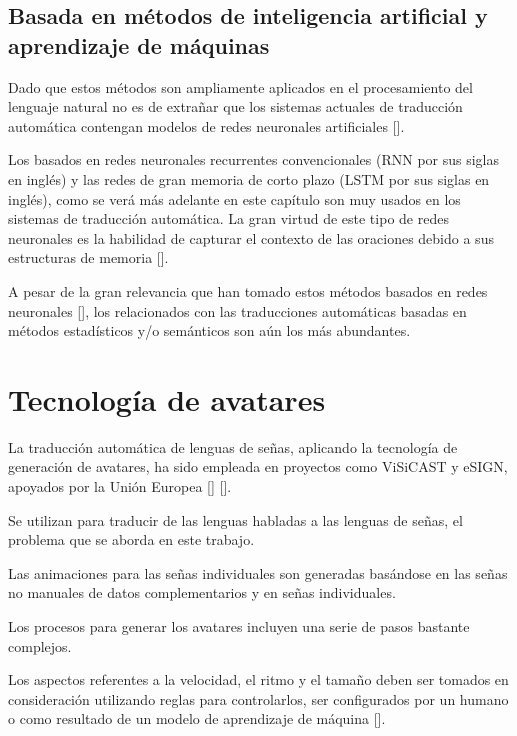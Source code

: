 \subsection{Basada en métodos de inteligencia artificial y aprendizaje de máquinas}\label{subsection:state-of-the-art:traduccion:maquina}
Dado que estos métodos son ampliamente aplicados en el procesamiento del lenguaje natural no es de extrañar que los sistemas actuales de traducción automática contengan modelos de redes
neuronales artificiales [\cite{koehn2017neural}]. 

Los basados en redes neuronales recurrentes convencionales (RNN por
sus siglas en inglés) y las redes de gran memoria de corto plazo (LSTM por sus siglas
en inglés), como se verá más adelante en este capítulo son muy usados en los sistemas de traducción automática. La gran virtud de este tipo  de
redes neuronales es la habilidad de capturar el contexto de las oraciones debido a sus
estructuras de memoria [\cite{sutskever2014sequence}].

A pesar de la gran relevancia que han tomado estos métodos basados en redes neuronales  [\cite{garje2013survey}], los relacionados con las traducciones automáticas basadas en métodos estadísticos y/o semánticos son aún los más abundantes.


\section{Tecnología de avatares}\label{section:state-of-the-art:avatars}


La traducción automática de lenguas de señas, aplicando la tecnología de generación de avatares, ha sido empleada en proyectos como ViSiCAST  y eSIGN, apoyados por la Unión Europea [\cite{visicast_at_uea_2021}] [\cite{esign_at_uea_2021}]. 

Se utilizan para traducir de las lenguas habladas a las lenguas de señas, el problema que se aborda en este trabajo.

Las animaciones para las señas individuales son generadas basándose
en las señas no manuales de datos complementarios y en señas individuales. 

Los procesos para generar los avatares incluyen una serie de pasos bastante complejos.
 
Los aspectos referentes a la velocidad, el ritmo y el tamaño deben ser tomados en
consideración utilizando reglas para controlarlos, ser configurados por un humano o
como resultado de un modelo de aprendizaje de máquina [\cite{nguyen2021automatic}].

